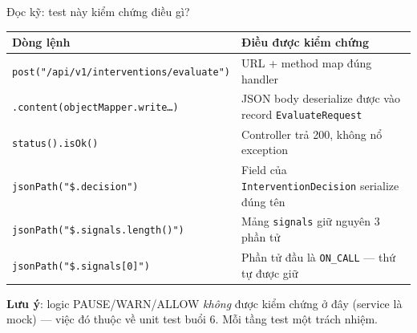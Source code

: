\documentclass[aspectratio=169,12pt]{beamer}
\begin{document}
\begin{frame}{Đọc kỹ: test này kiểm chứng điều gì?}
  \begin{center}
  \footnotesize
  \setlength{\tabcolsep}{4pt}
  \begin{tabular}{>{\raggedright\arraybackslash}p{5.6cm}>{\raggedright\arraybackslash}p{6.6cm}}
    \toprule
    \textbf{Dòng lệnh} & \textbf{Điều được kiểm chứng} \\
    \midrule
    \texttt{post("/api/v1/\allowbreak interventions/\allowbreak evaluate")} & URL + method map đúng handler \\
    \texttt{.content(\allowbreak objectMapper.write\ldots)} & JSON body deserialize được vào record \texttt{EvaluateRequest} \\
    \texttt{status().isOk()} & Controller trả 200, không nổ exception \\
    \texttt{jsonPath("\$.decision")} & Field của \texttt{InterventionDecision} serialize đúng tên \\
    \texttt{jsonPath("\$.signals.\allowbreak length()")} & Mảng \texttt{signals} giữ nguyên 3 phần tử \\
    \texttt{jsonPath("\$.\allowbreak signals[0]")} & Phần tử đầu là \texttt{ON\_CALL} --- thứ tự được giữ \\
    \bottomrule
  \end{tabular}
  \end{center}
  {\small \textbf{Lưu ý}: logic PAUSE/WARN/ALLOW \emph{không} được kiểm chứng
  ở đây (service là mock) --- việc đó thuộc về unit test buổi 6. Mỗi tầng test
  một trách nhiệm.}
\end{frame}
\end{document}
